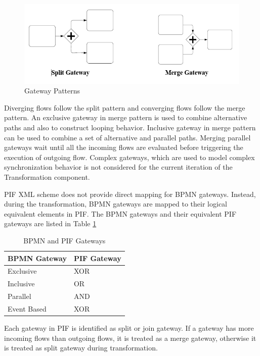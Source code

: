\documentclass{article}
\begin{document}
\begin{figure}[ht]
\center
\includegraphics[scale =0.6]{MergeSplit.png}
\caption{Gateway Patterns}
\label{fig:splitmerge}
\end{figure}

Diverging flows follow the split pattern and converging flows follow the merge pattern. An exclusive gateway in merge pattern is used to combine alternative paths and also to construct looping behavior. Inclusive gateway in merge pattern can be used to combine a set of alternative and parallel paths. Merging parallel gateways wait until all the incoming flows are evaluated before triggering the execution of outgoing flow. Complex gateways, which are used to model complex synchronization behavior is not considered for the current iteration of the Transformation component.
 
PIF XML scheme does not provide direct mapping for BPMN gateways. Instead, during the transformation, BPMN gateways are mapped to their logical equivalent elements in PIF. The BPMN gateways and their equivalent PIF gateways are listed in Table \ref{tab:gways}

\begin{table}[ht]
\centering
\begin{tabular}{|l|l|}
\hline
BPMN Gateway & PIF Gateway \\
\hline \hline
Exclusive & XOR \\
\hline
Inclusive & OR \\
\hline
Parallel & AND \\
\hline
Event Based & XOR \\
\hline
\end{tabular}
\caption{BPMN and PIF Gateways}
\label{tab:gways}
\end{table}

Each gateway in PIF is identified as split or join gateway. If a gateway has more incoming flows than outgoing flows, it is treated as a merge gateway, otherwise it is treated as split gateway during transformation.
\end{document}
